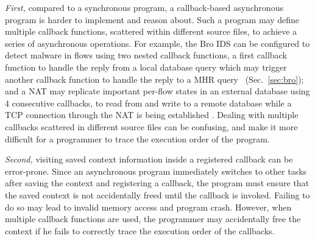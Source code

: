 \textit{First,} compared to a synchronous program, a callback-based asynchronous program is harder to implement and reason about. %
Such a program may define multiple callback functions, scattered within different source files, to achieve a series of asynchronous operations. For example, the Bro IDS can be configured to detect malware in flows using two nested callback functions, a first callback function to handle the reply from a local database query which may trigger another callback function to handle the reply to a MHR query~ (Sec.~\ref{sec:bro}); and a NAT may replicate important per-flow states in an external database using 4 consecutive callbacks, to read from and write to a remote database while a TCP connection through the NAT is being established \cite{201545}. Dealing with multiple callbacks scattered in different source files can be confusing, and make it more difficult for a programmer to trace the execution order of the program. %



\textit{Second,} visiting saved context information inside a registered callback can be error-prone. Since an asynchronous program immediately switches to other tasks after saving the context and registering a callback, the program must ensure that the saved context is not accidentally freed until the callback is invoked. Failing to do so may lead to invalid memory access and program crash. However, when multiple callback functions are used, the programmer may accidentally free the context if he fails to correctly trace the execution order of the callbacks.

